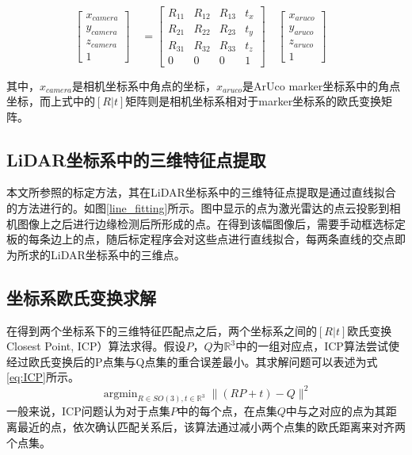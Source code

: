 \begin{equation}
\begin{bmatrix} x_{camera}\\y_{camera}\\z_{camera}\\ 1 \end{bmatrix}\quad = \begin{bmatrix} R_{11}&R_{12}&R_{13}&t_x\\R_{21}&R_{22}&R_{23}&t_y\\R_{31}&R_{32}&R_{33}&t_z\\ 0&0&0&1 \end{bmatrix}\quad \begin{bmatrix} x_{aruco}\\y_{aruco}\\z_{aruco}\\ 1 \end{bmatrix}\quad
\end{equation}
    
其中，$x_{camera}$是相机坐标系中角点的坐标，$x_{aruco}$是ArUco marker坐标系中的角点坐标，而上式中的$[R|t]$矩阵则是相机坐标系相对于marker坐标系的欧氏变换矩阵。

\subsection{LiDAR坐标系中的三维特征点提取}

本文所参照的标定方法，其在LiDAR坐标系中的三维特征点提取是通过直线拟合的方法进行的。如图\ref{line_fitting}所示。图中显示的点为激光雷达的点云投影到相机图像上之后进行边缘检测后所形成的点。在得到该幅图像后，需要手动框选标定板的每条边上的点，随后标定程序会对这些点进行直线拟合，每两条直线的交点即为所求的LiDAR坐标系中的三维点。

\subsection{坐标系欧氏变换求解}

在得到两个坐标系下的三维特征匹配点之后，两个坐标系之间的$[R|t]$欧氏变换 Closest Point, ICP）算法求得。假设$P$，$Q$为$\mathbb{R}^3$中的一组对应点，ICP算法尝试使经过欧氏变换后的P点集与Q点集的重合误差最小。其求解问题可以表述为式\ref{eq:ICP}所示。
\begin{equation}
    \mathop{\arg\min}_{R\in SO(3), t\in \mathbb{R}^3}  \| (RP+t)-Q \|^2 
    \label{eq:ICP}
\end{equation}
一般来说，ICP问题认为对于点集$P$中的每个点，在点集$Q$中与之对应的点为其距离最近的点，依次确认匹配关系后，该算法通过减小两个点集的欧氏距离来对齐两个点集。

